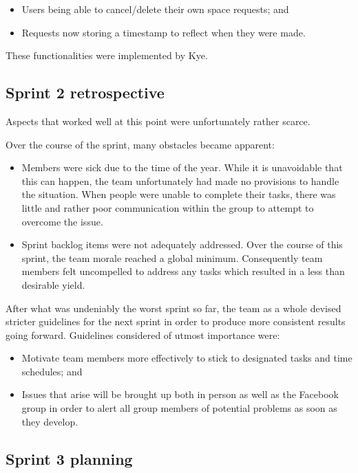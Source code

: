 \documentclass[a4paper,titlepage,12pt]{article}
\begin{document}
\begin{itemize}
	\item Users being able to cancel/delete their own space requests; and
	\item Requests now storing a timestamp to reflect when they were made.
\end{itemize}

These functionalities were implemented by Kye.

\subsection{Sprint 2 retrospective}

Aspects that worked well at this point were unfortunately rather scarce.

Over the course of the sprint, many obstacles became apparent:

\begin{itemize}
	\item Members were sick due to the time of the year. While it is
	      unavoidable that this can happen, the team unfortunately had made
	      no provisions to handle the situation. When people were unable to
	      complete their tasks, there was little and rather poor
	      communication within the group to attempt to overcome the issue.
	\item Sprint backlog items were not adequately addressed. Over the
	      course of this sprint, the team morale reached a global minimum.
	      Consequently team members felt uncompelled to address any tasks
	      which resulted in a less than desirable yield.
\end{itemize}

After what was undeniably the worst sprint so far, the team as a whole devised
stricter guidelines for the next sprint in order to produce more consistent
results going forward. Guidelines considered of utmost importance were:

\begin{itemize}
	\item Motivate team members more effectively to stick to designated
	      tasks and time schedules; and
	\item Issues that arise will be brought up both in person as well as
	      the Facebook group in order to alert all group members of
	      potential problems as soon as they develop.
\end{itemize}

\subsection{Sprint 3 planning}
\end{document}
